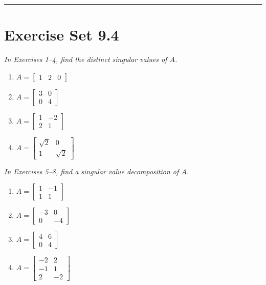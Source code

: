 \documentclass{article}
\begin{document}
\vspace{3mm}
\noindent\rule{\linewidth}{0.5pt}

\section*{Exercise Set 9.4}

\noindent\textit{In Exercises 1--4, find the distinct singular values of $A$.}

\begin{enumerate}
  \item $A = \begin{bmatrix}1&2&0\end{bmatrix}$

  \item $A = \begin{bmatrix}3&0\\0&4\end{bmatrix}$

  \item $A = \begin{bmatrix}1&-2\\2&1\end{bmatrix}$

  \item $A = \begin{bmatrix}\sqrt{2}&0\\1&\sqrt{2}\end{bmatrix}$

\end{enumerate}

\noindent\textit{In Exercises 5--8, find a singular value decomposition of $A$.}

\begin{enumerate}
  \item[5.] $A = \begin{bmatrix}1&-1\\1&1\end{bmatrix}$

  \item[6.] $A = \begin{bmatrix}-3&0\\0&-4\end{bmatrix}$

  \item[7.] $A = \begin{bmatrix}4&6\\0&4\end{bmatrix}$

  \item[9.] $A = \begin{bmatrix}-2&2\\-1&1\\2&-2\end{bmatrix}$

\end{enumerate}
\end{document}
